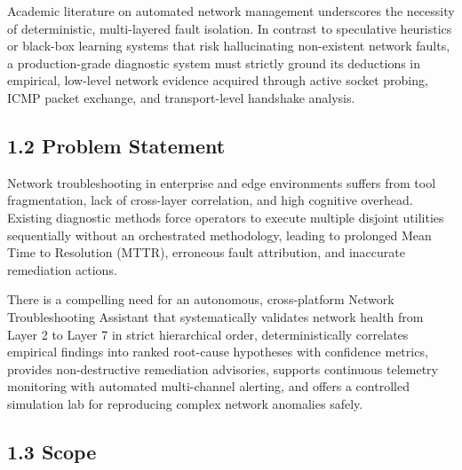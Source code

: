 \documentclass[
]{article}
\begin{document}
Academic literature on automated network management underscores the necessity of deterministic, multi-layered fault isolation. In contrast to speculative heuristics or black-box learning systems that risk hallucinating non-existent network faults, a production-grade diagnostic system must strictly ground its deductions in empirical, low-level network evidence acquired through active socket probing, ICMP packet exchange, and transport-level handshake analysis.

\subsection{1.2 Problem Statement}\label{problem-statement}

Network troubleshooting in enterprise and edge environments suffers from tool fragmentation, lack of cross-layer correlation, and high cognitive overhead. Existing diagnostic methods force operators to execute multiple disjoint utilities sequentially without an orchestrated methodology, leading to prolonged Mean Time to Resolution (MTTR), erroneous fault attribution, and inaccurate remediation actions. 

There is a compelling need for an autonomous, cross-platform Network Troubleshooting Assistant that systematically validates network health from Layer 2 to Layer 7 in strict hierarchical order, deterministically correlates empirical findings into ranked root-cause hypotheses with confidence metrics, provides non-destructive remediation advisories, supports continuous telemetry monitoring with automated multi-channel alerting, and offers a controlled simulation lab for reproducing complex network anomalies safely.

\subsection{1.3 Scope}\label{scope}
\end{document}
